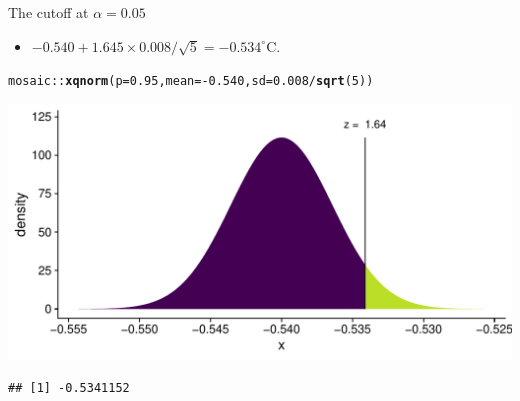 \documentclass[10pt]{beamer}\usepackage[]{graphicx}\usepackage[]{color}
\makeatletter
\def\maxwidth{ %
  \ifdim\Gin@nat@width>\linewidth
    \linewidth
  \else
    \Gin@nat@width
  \fi
}
\newcommand{\hlnum}[1]{\textcolor[rgb]{0.686,0.059,0.569}{#1}}%
\newcommand{\hlopt}[1]{\textcolor[rgb]{0,0,0}{#1}}%
\newcommand{\hlstd}[1]{\textcolor[rgb]{0.345,0.345,0.345}{#1}}%
\newcommand{\hlkwc}[1]{\textcolor[rgb]{0.333,0.667,0.333}{#1}}%
\newcommand{\hlkwd}[1]{\textcolor[rgb]{0.737,0.353,0.396}{\textbf{#1}}}%
\newenvironment{kframe}{%
 \def\at@end@of@kframe{}%
 \ifinner\ifhmode%
  \def\at@end@of@kframe{\end{minipage}}%
  \begin{minipage}{\columnwidth}%
 \fi\fi%
 \def\FrameCommand##1{\hskip\@totalleftmargin \hskip-\fboxsep
 \colorbox{shadecolor}{##1}\hskip-\fboxsep
     \hskip-\linewidth \hskip-\@totalleftmargin \hskip\columnwidth}%
 \MakeFramed {\advance\hsize-\width
   \@totalleftmargin\z@ \linewidth\hsize
   \@setminipage}}%
 {\par\unskip\endMakeFramed%
 \at@end@of@kframe}
\newenvironment{knitrout}{}{} %
\makeatother
\begin{document}
\begin{frame}[fragile]{The cutoff at $\alpha = 0.05$}
	\begin{itemize}
		\item $-0.540 + 1.645 \times 0.008/\sqrt{5}  = -0.534^{\circ}\textrm{C}.$
	\end{itemize}
	
\begin{knitrout}\tiny
{}\color{fgcolor}\begin{kframe}
\begin{alltt}
\hlstd{mosaic}\hlopt{::}\hlkwd{xqnorm}\hlstd{(}\hlkwc{p} \hlstd{=} \hlnum{0.95}\hlstd{,} \hlkwc{mean} \hlstd{=} \hlopt{-}\hlnum{0.540}\hlstd{,} \hlkwc{sd} \hlstd{=} \hlnum{0.008}\hlopt{/}\hlkwd{sqrt}\hlstd{(}\hlnum{5}\hlstd{))}
\end{alltt}
\end{kframe}

{\centering \includegraphics[width=\maxwidth]{figure/unnamed-chunk-7-1} 

}


\begin{kframe}\begin{verbatim}
## [1] -0.5341152
\end{verbatim}
\end{kframe}
\end{knitrout}
\end{frame}
\end{document}
